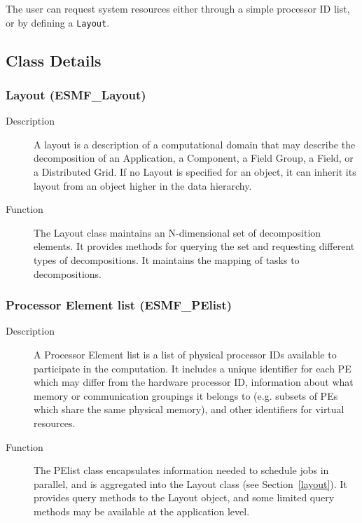 The user can request system resources either through a simple processor
ID list, or by defining a {\tt Layout}.

\subsection{Class Details}

\subsubsection{Layout (ESMF\_Layout)}
\label{sec:layout} 
\begin{description}
\item [Description] A layout is a description of a computational domain that
may describe the decomposition of an Application, a Component, a Field Group, a Field, or 
a Distributed Grid.
If no Layout is specified for an object, it can inherit its layout from an object
higher in the data hierarchy.  
\item [Function] The Layout class maintains an N-dimensional set of decomposition
elements.  It provides methods for querying the set and requesting different
types of decompositions.  It maintains the mapping of tasks to decompositions.
\end{description}

\subsubsection{Processor Element list (ESMF\_PElist)}
\label{sec:pelist} 
\begin{description}
\item [Description] A Processor Element list is a list of physical processor IDs
available to participate in the computation.  
It includes a unique identifier for each PE which may differ from the
hardware processor ID, 
information about what memory or communication groupings it belongs to (e.g. subsets 
of PEs which share the same physical memory), 
and other identifiers for virtual resources.  
\item [Function] The PElist class encapsulates information needed to schedule
jobs in parallel, and is aggregated into the Layout class (see Section~\ref{layout}).
It provides query methods to the Layout object, and some limited query methods
may be available at the application level.
\end{description}

